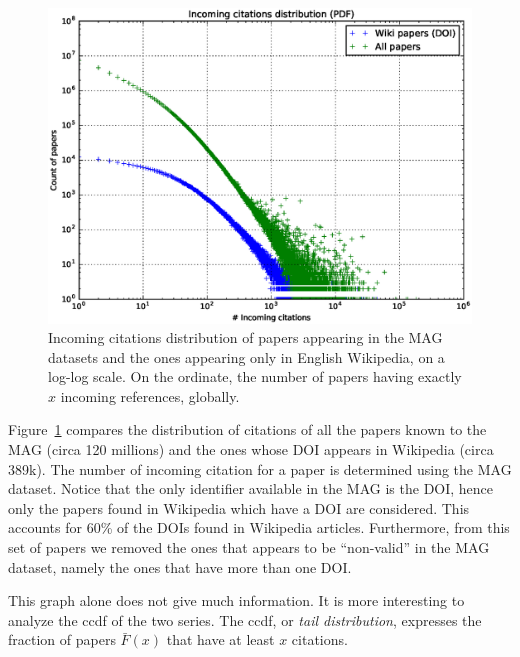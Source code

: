 \begin{figure}[h]
\centering
\includegraphics[keepaspectratio=true, width=\textwidth]{assets/incoming_citations_distribution_pdf}
\caption{Incoming citations distribution of papers appearing in the \ac{MAG} datasets and the ones appearing only in English Wikipedia, on a log-log scale.
On the ordinate, the number of papers having exactly $x$ incoming references, globally.}
\label{fig:incoming_citations_distribution_pdf}
\end{figure}

Figure~\ref{fig:incoming_citations_distribution_pdf} compares the distribution of citations of all the papers known to the MAG (circa 120 millions) and the ones whose \ac{DOI} appears in Wikipedia (circa 389k).
The number of incoming citation for a paper is determined using the \ac{MAG} dataset.
Notice that the only identifier available in the \ac{MAG} is the \ac{DOI}, hence only the papers found in Wikipedia which have a \ac{DOI} are considered.
This accounts for 60\% of the \acp{DOI} found in Wikipedia articles.
Furthermore, from this set of papers we removed the ones that appears to be ``non-valid'' in the \ac{MAG} dataset, namely the ones that have more than one \ac{DOI}.

This graph alone does not give much information.
It is more interesting to analyze the \ac{ccdf} of the two series.
The \ac{ccdf}, or \emph{tail distribution}, expresses the fraction of papers $\bar{F}(x)$ that have at least $x$ citations.

